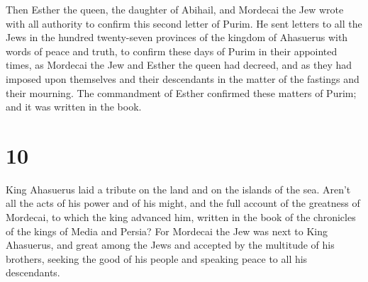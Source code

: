  Then Esther the queen, the daughter of Abihail, and
Mordecai the Jew wrote with all authority to confirm this second letter
of Purim.  He sent letters to all the Jews in the hundred
twenty-seven provinces of the kingdom of Ahasuerus with words of peace
and truth,  to confirm these days of Purim in their
appointed times, as Mordecai the Jew and Esther the queen had decreed,
and as they had imposed upon themselves and their descendants in the
matter of the fastings and their mourning.  The
commandment of Esther confirmed these matters of Purim; and it was
written in the book.

\hypertarget{section-9}{%
\section{10}\label{section-9}}

 King Ahasuerus laid a tribute on the land and on the
islands of the sea.  Aren't all the acts of his power and
of his might, and the full account of the greatness of Mordecai, to
which the king advanced him, written in the book of the chronicles of
the kings of Media and Persia?  For Mordecai the Jew was
next to King Ahasuerus, and great among the Jews and accepted by the
multitude of his brothers, seeking the good of his people and speaking
peace to all his descendants.
